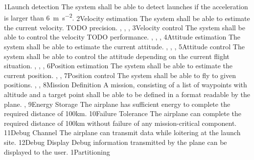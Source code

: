 \req
    {1}{Launch detection}
    {
        The system shall be able to detect launches if the
        acceleration is larger than \SI{6}{\meter \per \second^2}.
    }
    {
    }
    {}
\req
    {2}{Velocity estimation}
    {
        The system shall be able to estimate the current velocity.   
        TODO precision.
    }
    {
        , , , 
    }
    {}
\req
    {3}{Velocity control}
    {
        The system shall be able to control the velocity
        TODO performance.
    }
    {
        , , , 
    }
    {}
\req
    {4}{Attitude estimation}
    {
        The system shall be able to estimate the current attitude.   
    }
    {
        , , , 
    }
    {}
\req
    {5}{Attitude control}
    {
        The system shall be able to control the attitude depending on
        the current flight situation.
    }
    {
        , , , 
    }
    {}
\req
    {6}{Position estimation}
    {
        The system shall be able to estimate the current position.
    }
    {
        , , 
    }
    {}
\req
    {7}{Position control}
    {
        The system shall be able to fly to given positions.
    }
    {
        , , 
    }
    {}
\req
    {8}{Mission Definition}
    {
        A mission, consisting of a list of waypoints with altitude
        and a target point shall be able to be defined in a format
        readable by the plane.
    }
    {, }
    {}
\req
    {9}{Energy Storage}
    {
        The airplane has sufficient energy to complete the required distance
        of 100km.
    }
    {}
    {}
\req
    {10}{Failure Tolerance}
    {
        The airplane can complete the required distance of 100km without
        failure of any mission-critical component. 
    }
    {}
    {}
\req
    {11}{Debug Channel}
    {
        The airplane can transmit data while loitering
        at the launch site.
    }
    {}
    {}
\req
    {12}{Debug Display}
    {
        Debug information transmitted by the plane can be displayed
        to the user.
    }
    {}
    {}
\dd
    {1}{Partitioning}
